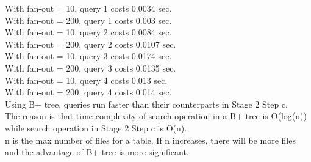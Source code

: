 \documentclass[a4paper]{article}
\begin{document}
With fan-out = 10, query 1 costs 0.0034 sec.\\
With fan-out = 200, query 1 costs 0.003 sec.\\
With fan-out = 10, query 2 costs 0.0084 sec.\\
With fan-out = 200, query 2 costs 0.0107 sec.\\
With fan-out = 10, query 3 costs 0.0174 sec.\\
With fan-out = 200, query 3 costs 0.0135 sec.\\
With fan-out = 10, query 4 costs 0.013 sec.\\
With fan-out = 200, query 4 costs 0.014 sec.\\
Using B+ tree, queries run faster than their counterparts in Stage 2 Step c.\\
The reason is that time complexity of search operation in a B+ tree is O(log(n)) while search operation in Stage 2 Step c is O(n).\\
n is the max number of files for a table. If n increases, there will be more files and the advantage of B+ tree is more significant.\\
\end{document}
